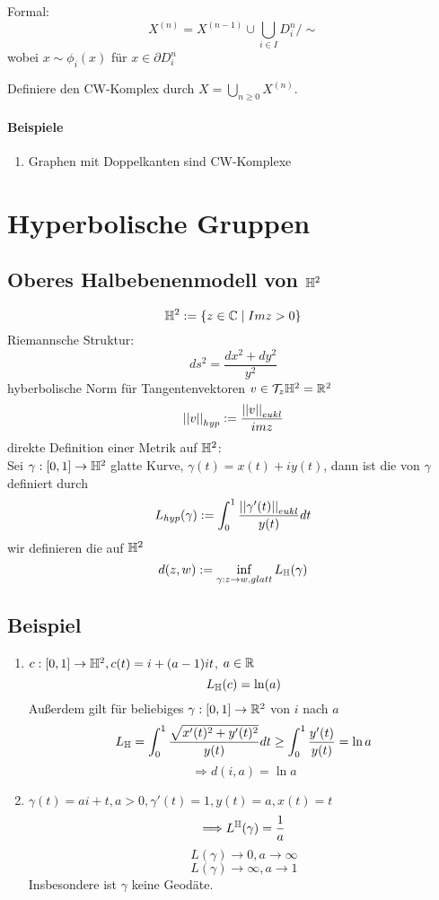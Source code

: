 \documentclass{article}
\newcommand{\Cz}{\mathbb{C}}
\begin{document}
Formal:
\[X^{(n)} = X^{(n-1)} \cup \bigcup_{i\in I}D^n_i/\sim \]
wobei $x\sim \phi_i(x)$ für $x \in \partial D_i^n$

Definiere den CW-Komplex durch $X = \bigcup_{n\geq 0} X^{(n)}$.

\paragraph{Beispiele}
\begin{enumerate}
	\item Graphen mit Doppelkanten sind CW-Komplexe
\end{enumerate}



\newpage
\section{Hyperbolische Gruppen}
\subsection{Oberes Halbebenenmodell von $\mathbb{H}^2$}
\[\H^2 := \set{z \in \Cz }{Im z > 0} \]
Riemannsche Struktur:
\[ds^2 = \frac{dx^2 + dy^2}{y^2} \]
hyberbolische Norm für Tangentenvektoren $v \in \mathcal{T}_z\mathbb{H}^2 = \mathbb{R}^2$
\[\left|\left|v\right|\right|_{hyp} := \frac{\left|\left|v\right|\right|_{eukl}}{im z} \]
direkte Definition einer Metrik auf $\mathbb{H}^2$:\\
Sei $\gamma: [0,1] \rightarrow \mathbb{H}^2 $ glatte Kurve, $\gamma(t) = x(t) + iy(t)$, dann ist die  von $\gamma$ definiert durch
\[L_{hyp}(\gamma) := \int_{0}^{1} \frac{\left|\left|\gamma'(t)\right|\right|_{eukl}}{y(t)}dt\]
wir definieren die  auf $\mathbb{H}^2$
\[d(z,w) := \inf_{\gamma : z \rightarrow w, glatt}L_{\mathbb{H}}(\gamma) \]

\subsection{Beispiel}
\begin{enumerate}
	\item
	$c : [0,1] \rightarrow \mathbb{H}^2, c(t) = i + (a-1)it$, $a \in \mathbb{R}$
	\[L_{\mathbb{H}}(c) = \ln(a) \]
	Außerdem gilt für beliebiges $\gamma : [0,1] \rightarrow \mathbb{R}^2$ von $i$ nach $a$
	\[L_{\mathbb{H}} = \int_0^1\frac{\sqrt{x'(t)^2 + y'(t)^2}}{y(t)}dt \geq \int_0^1\frac{y'(t)}{y(t)} = \ln a\]
	\[\Longrightarrow d(i,a) = \ln a\]
	\item
	$\gamma(t) = ai + t, a > 0, \gamma'(t) = 1, y(t) = a, x(t) =t$
	\[\Longrightarrow L^{\mathbb{H}}(\gamma) = \frac{1}{a} \]
	\[L(\gamma) \rightarrow 0, a \rightarrow \infty \]
	\[L(\gamma) \rightarrow \infty, a \rightarrow 1 \]
	Insbesondere ist $\gamma$ keine Geodäte.
\end{enumerate}
\end{document}
